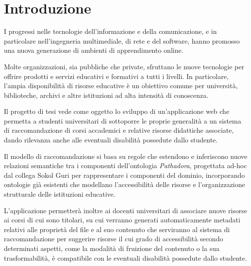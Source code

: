%
\chapter*{Introduzione}                 %

I progressi nelle tecnologie dell'informazione e della comunicazione, e in particolare nell'ingegneria multimediale, di rete e del software, hanno promosso una nuova generazione di ambienti di apprendimento online.

Molte organizzazioni, sia pubbliche che private, sfruttano le nuove tecnologie per offrire prodotti e servizi educativi e formativi a tutti i livelli. In particolare, l'ampia disponibilità di risorse educative è un obiettivo comune per università, biblioteche, archivi e altre istituzioni ad alta intensità di conoscenza.

\vspace{5mm}

Il progetto di tesi vede come oggetto lo sviluppo di un'applicazione web che permetta a studenti universitari di sottoporre le proprie generalità a un sistema di raccomandazione di corsi accademici e relative risorse didattiche associate, dando rilevanza anche alle eventuali disabilità possedute dallo studente.

Il modello di raccomandazione si basa su regole che estendono e inferiscono nuove relazioni semantiche tra i componenti dell'ontologia \textit{Pathadora}, progettata ad-hoc dal collega Sokol Guri per rappresentare i componenti del dominio, incorporando ontologie già esistenti che modellano l'accessibilità delle risorse e l’organizzazione strutturale delle istituzioni educative. 

\vspace{5mm}

L'applicazione permetterà inoltre ai docenti universitari di associare nuove risorse ai corsi di cui sono titolari, su cui verranno generati automaticamente metadati relativi alle proprietà del file e al suo contenuto che serviranno al sistema di raccomandazione per suggerire risorse il cui grado di accessibilità secondo determinati aspetti, come la modalità di fruizione del contenuto o la sua trasformabilità, è compatibile con le eventuali disabilità possedute dallo studente.

